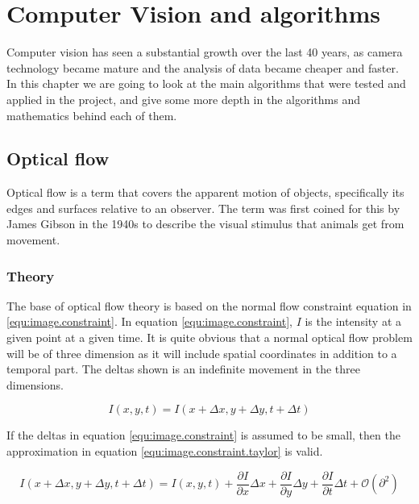 
\chapter{Computer Vision and algorithms}

Computer vision has seen a substantial growth over the last 40 years, as camera technology became mature 
and the analysis of data became cheaper and faster. In this chapter we are going to look at the main algorithms 
that were tested and applied in the project, and give some more depth in the algorithms and mathematics behind each of them.


\section{Optical flow}
Optical flow is a term that covers the apparent motion of objects, specifically its edges and surfaces 
relative to an observer. The term was first coined for this by James Gibson in the 1940s 
to describe the visual stimulus that animals get from movement\citet{gibson50}.


\subsection{Theory}
The base of optical flow theory is based on the normal flow constraint equation in \eqref{equ:image.constraint}. In equation \eqref{equ:image.constraint}, $I$ is the intensity
at a given point at a given time. It is quite obvious that a normal optical flow problem will be of three dimension as it will include spatial coordinates in addition
to a temporal part. The deltas shown is an indefinite movement in the three dimensions.


\begin{equation}\label{equ:image.constraint}
	I(x,y,t) = I(x + \Delta x, y+ \Delta y, t + \Delta t)
\end{equation}

If the deltas in equation \eqref{equ:image.constraint} is assumed to be small, then the approximation in equation \eqref{equ:image.constraint.taylor} is valid.

\begin{equation}\label{equ:image.constraint.taylor}
	I(x + \Delta x, y+ \Delta y, t + \Delta t) = I(x,y,t) + \frac{\partial I}{\partial x} \Delta x + 
		\frac{\partial I}{\partial y} \Delta y + \frac{\partial I}{\partial t} \Delta t + \mathcal{O}(\partial^2)
\end{equation}

